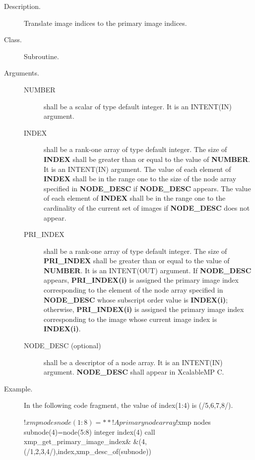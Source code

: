 \begin{description}
 \item[Description.] Translate image indices to the primary image indices.

 \item[Class.] Subroutine.
	    
 \item[Arguments.] \hspace{1cm}
	    \begin{description}
	     \item[NUMBER] shall be a scalar of type default integer. It
			is an INTENT(IN) argument.
	     \item[INDEX] shall be a rank-one array of type default integer.
			The size of {\bfseries INDEX} shall be
			greater than or equal to the value of {\bfseries NUMBER}.
			It is an INTENT(IN) argument.
			The value of each element of {\bfseries INDEX} shall be in
			the range one
			to the size of the node array specified 
			in {\bfseries NODE\_DESC} if {\bfseries NODE\_DESC} appears.
			The value of each element of {\bfseries INDEX} shall be in
			the range one
			to the cardinality of the current set of images
			if {\bfseries NODE\_DESC} does not appear.
	     \item[PRI\_INDEX] shall be a rank-one array of type default integer.
			The size of {\bfseries PRI\_INDEX} shall be
			greater than or equal to the value of {\bfseries NUMBER}.
			It is an INTENT(OUT) argument.
			If {\bfseries NODE\_DESC} appears,
			{\bfseries PRI\_INDEX(i)} is assigned the primary image index
			corresponding to the element of the node array
			specified in {\bfseries NODE\_DESC}
			whose subscript order value is {\bfseries INDEX(i)}; otherwise,
			{\bfseries PRI\_INDEX(i)} is assigned the primary image index
			corresponding to the image whose
			current image index is {\bfseries INDEX(i)}.
	     \item[NODE\_DESC (optional)] shall be a descriptor of a
			node array. It is an INTENT(IN) argument.
			{\bfseries NODE\_DESC} shall appear in XcalableMP C.
	    \end{description}

 \item[Example.] 
In the following code fragment, the value of {\ttfamily index(1:4)} is {\ttfamily (/5,6,7,8/)}.
\begin{XFexample}
!$xmp nodes node(1:8)=**        ! A primary node array
!$xmp nodes subnode(4)=node(5:8)
      integer index(4)
      call xmp_get_primary_image_index&
           &(4,(/1,2,3,4/),index,xmp_desc_of(subnode))
\end{XFexample}
\end{description}


